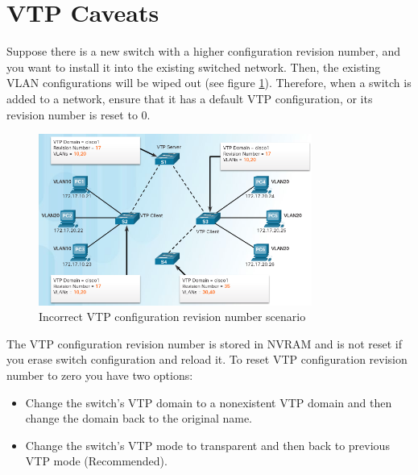 \section{VTP Caveats}

Suppose there is a new switch with a higher configuration revision number, and you want to install it into the existing switched network. Then, the existing VLAN configurations will be wiped out (see figure \ref{VTP-caveats}). Therefore, when a switch is added to a network, ensure that it has a default VTP configuration, or its revision number is reset to 0.\\

\begin{figure}[hbtp]
\centering
\includegraphics[width=0.8\textwidth]{pictures/VTP-caveats.png}
\caption{Incorrect VTP configuration revision number scenario}
\label{VTP-caveats}
\end{figure}

The VTP configuration revision number is stored in NVRAM and is not reset if you erase switch configuration and reload it. To reset VTP configuration revision number to zero you have two options:

\begin{itemize}
\item Change the switch's VTP domain to a nonexistent VTP domain and then change the domain back to the original name.
\item Change the switch's VTP mode to transparent and then back to previous VTP mode (Recommended).
\end{itemize}
